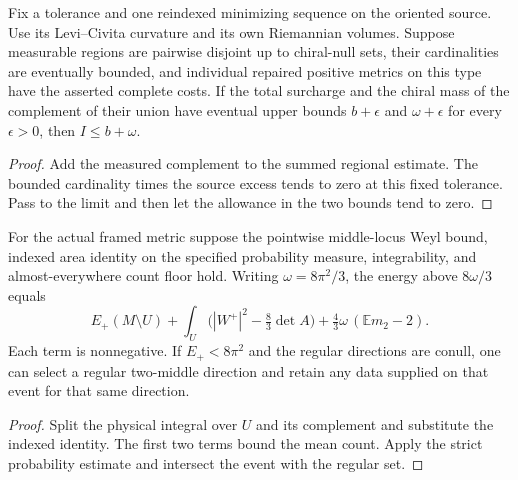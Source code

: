 \begin{lemma}
\label{lem:ed03-measured-residual}
\leanok
Fix a tolerance and one reindexed minimizing sequence on the oriented source.
Use its Levi--Civita curvature and its own Riemannian volumes. Suppose
measurable regions are pairwise disjoint up to chiral-null sets, their
cardinalities are eventually bounded, and individual repaired positive
metrics on this type have the asserted complete costs. If the total
surcharge and the chiral mass of the complement of their union have
eventual upper bounds \(b+\epsilon\) and \(\omega+\epsilon\) for
every \(\epsilon>0\), then \(I\le b+\omega\).
\end{lemma}
\begin{proof}
\leanok
Add the measured complement to the summed regional estimate. The bounded
cardinality times the source excess tends to zero at this fixed tolerance.
Pass to the limit and then let the allowance in the two bounds tend to zero.
\end{proof}

\begin{lemma}
\label{lem:ed03-indexed-budget}
\leanok
For the actual framed metric suppose the pointwise middle-locus Weyl
bound, indexed area identity on the specified probability measure,
integrability, and almost-everywhere count floor hold.
Writing \(\omega=8\pi^2/3\), the energy above \(8\omega/3\) equals
\[
 E_+(M\setminus U)
 +\int_U\bigl(|W^+|^2-\tfrac83\det A\bigr)
 +\tfrac43\omega\,(\mathbb E m_2-2).
\]
Each term is nonnegative. If \(E_+<8\pi^2\) and the regular directions
are conull, one can select a regular two-middle direction and retain
any data supplied on that event for that same direction.
\end{lemma}
\begin{proof}
\leanok
Split the physical integral over \(U\) and its complement and substitute
the indexed identity. The first two terms bound the mean count.
Apply the strict probability estimate and intersect the event with the
regular set.
\end{proof}

